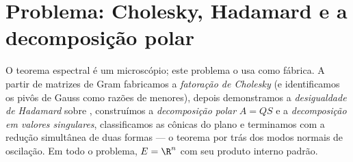 \section{Problema: Cholesky, Hadamard e a decomposição polar}

\begin{problem}\label{pb:b2:quadratic:1}
O teorema espectral é um microscópio; este problema o usa como
fábrica. A partir de matrizes de Gram fabricamos a \emph{fatoração
de Cholesky} (e identificamos os
pivôs de Gauss como razões de menores), depois demonstramos a \emph{desigualdade
de Hadamard} sobre , construímos
a \emph{decomposição polar} $A =
QS$ e a \emph{decomposição em valores singulares}, classificamos as cônicas
do plano e terminamos com a redução simultânea de duas formas ---
o teorema por trás dos modos normais de oscilação. Em todo o problema, $E =
\R^n$ com seu produto interno padrão.


\end{problem}
